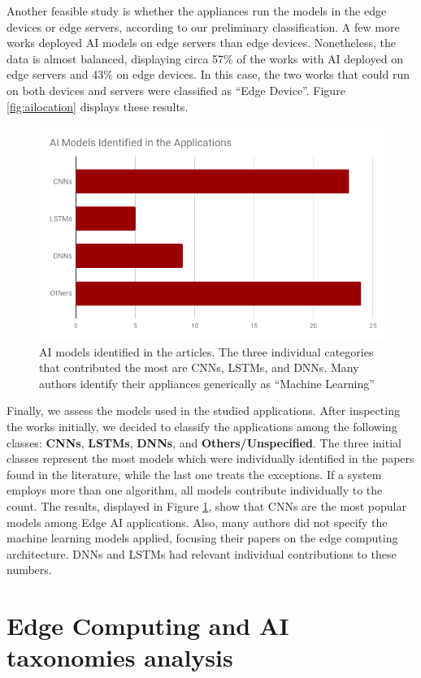 Another feasible study is whether the appliances run the models in the edge devices or edge servers, according to our preliminary classification. A few more works deployed AI models on edge servers than edge devices. Nonetheless, the data is almost balanced, displaying circa 57\% of the works with AI deployed on edge servers and 43\% on edge devices. In this case, the two works that could run on both devices and servers were classified as ``Edge Device''. Figure \ref{fig:ailocation} displays these results.

\begin{figure}[h!]
    \centering
    \includegraphics[width = .8\linewidth]{Figures/ai-models.png}
    \caption{AI models identified in the articles. The three individual categories that contributed the most are CNNs, LSTMs, and DNNs. Many authors identify their appliances generically as ``Machine Learning''}
    \label{fig:aimodels}
\end{figure}

Finally, we assess the models used in the studied applications. After inspecting the works initially, we decided to classify the applications among the following classes: \textbf{CNNs}, \textbf{LSTMs}, \textbf{DNNs}, and \textbf{Others/Unspecified}. The three initial classes represent the most models which were individually identified in the papers found in the literature, while the last one treats the exceptions. If a system employs more than one algorithm, all models contribute individually to the count. The results, displayed in Figure \ref{fig:aimodels}, show that CNNs are the most popular models among Edge AI applications. Also, many authors did not specify the machine learning models applied, focusing their papers on the edge computing architecture. DNNs and LSTMs had relevant individual contributions to these numbers.


\section{Edge Computing and AI taxonomies analysis}
\label{sec:taxonomiesanalysis}

